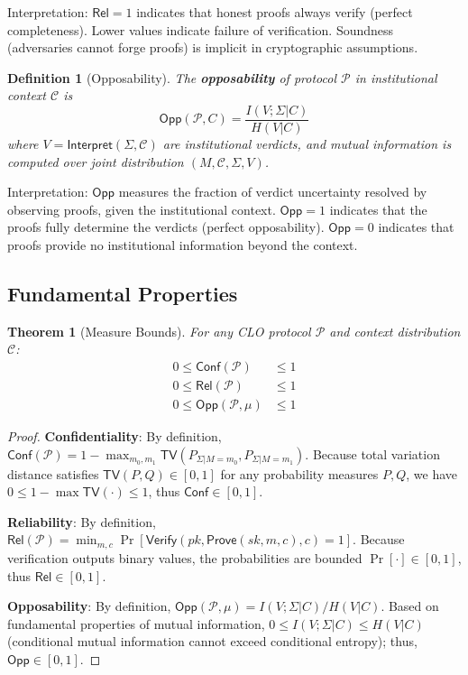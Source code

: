 \documentclass{ieeeaccess}
\newtheorem{theorem}{Theorem}[subsection]
\newtheorem{definition}{Definition}[subsection]
\newtheorem{proof}{Proof}[section]
\begin{document}
Interpretation: $\mathsf{Rel} = 1$ indicates that honest proofs always verify (perfect completeness). Lower values indicate failure of verification. Soundness (adversaries cannot forge proofs) is implicit in cryptographic assumptions.

\begin{definition}[Opposability]\label{def:opposability}
The \textbf{opposability} of protocol $\mathcal{P}$ in institutional context $\mathcal{C}$ is
\begin{equation}
\mathsf{Opp}(\mathcal{P}, C) = \frac{I(V;\Sigma|C)}{H(V|C)}
\end{equation}
where $V = \mathsf{Interpret}(\Sigma, \mathcal{C})$ are institutional verdicts, and mutual information is computed over joint distribution $(M, \mathcal{C}, \Sigma, V)$.
\end{definition}

Interpretation: $\mathsf{Opp}$ measures the fraction of verdict uncertainty resolved by observing proofs, given the institutional context. $\mathsf{Opp} = 1$ indicates that the proofs fully determine the verdicts (perfect opposability). $\mathsf{Opp} = 0$ indicates that proofs provide no institutional information beyond the context.


\subsection{Fundamental Properties}

\begin{theorem}[Measure Bounds]\label{thm:measure_bounds}
For any CLO protocol $\mathcal{P}$ and context distribution $\mathcal{C}$:
\begin{align}
0 \leq \mathsf{Conf}(\mathcal{P}) &\leq 1 \\
0 \leq \mathsf{Rel}(\mathcal{P}) &\leq 1 \\
0 \leq \mathsf{Opp}(\mathcal{P}, \mu) &\leq 1
\end{align}
\end{theorem}

\begin{proof}
\textbf{Confidentiality}: By definition, $\mathsf{Conf}(\mathcal{P}) = 1 - \max_{m_0,m_1} \mathsf{TV}(P_{\Sigma|M=m_0}, P_{\Sigma|M=m_1})$. Because total variation distance satisfies $\mathsf{TV}(P,Q) \in [0,1]$ for any probability measures $P,Q$, we have $0 \leq 1 - \max \mathsf{TV}(\cdot) \leq 1$, thus $\mathsf{Conf} \in [0,1]$.

\textbf{Reliability}: By definition, $\mathsf{Rel}(\mathcal{P}) = \min_{m,c} \Pr[\mathsf{Verify}(pk, \mathsf{Prove}(sk,m,c), c) = 1]$. Because verification outputs binary values, the probabilities are bounded $\Pr[\cdot] \in [0,1]$, thus $\mathsf{Rel} \in [0,1]$.

\textbf{Opposability}: By definition, $\mathsf{Opp}(\mathcal{P},\mu) = I(V;\Sigma|C)/H(V|C)$. Based on fundamental properties of mutual information, $0 \leq I(V;\Sigma|C) \leq H(V|C)$ (conditional mutual information cannot exceed conditional entropy); thus, $\mathsf{Opp} \in [0,1]$.
\end{proof}
\end{document}
